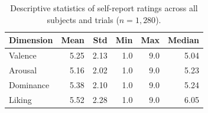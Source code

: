 \begin{table}[H]
  \centering
  \caption{Descriptive statistics of self-report ratings across all subjects and trials ($n = 1{,}280$).}
  \label{tab:ratings}
  \begin{tabular}{lrrrrr}
    \toprule
    Dimension & Mean & Std & Min & Max & Median \\
    \midrule
    Valence & 5.25 & 2.13 & 1.0 & 9.0 & 5.04 \\
    Arousal & 5.16 & 2.02 & 1.0 & 9.0 & 5.23 \\
    Dominance & 5.38 & 2.10 & 1.0 & 9.0 & 5.24 \\
    Liking & 5.52 & 2.28 & 1.0 & 9.0 & 6.05 \\
    \bottomrule
  \end{tabular}
\end{table}
